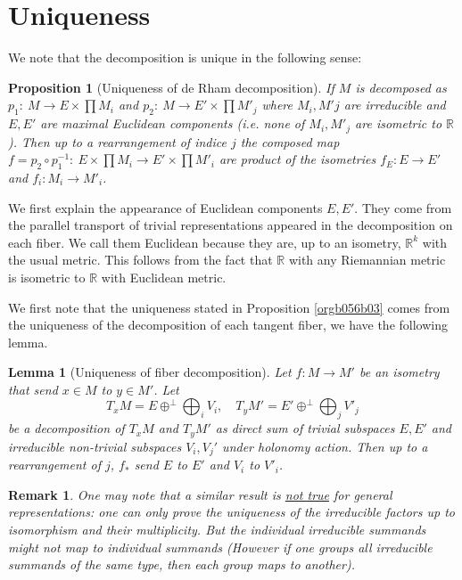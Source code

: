 \documentclass[11pt]{article}
\newtheorem{remark}{Remark}
\newtheorem{lemma}[theorem]{Lemma}
\newtheorem{proposition}{Proposition}[theorem]
\begin{document}
\section{Uniqueness}
\label{sec:org7171d65}
We note that the decomposition is unique in the following sense: 

\begin{proposition}[Uniqueness of de Rham decomposition]
\label{prop:uniqueness}
\label{orgb056b03} If \(M\) is decomposed as \(p_1:\ M\longrightarrow E\times \prod M_i\) and \(p_2:\
M\longrightarrow E'\times\prod M'_j\) where \(M_i, M'j\) are irreducible and \(E,E'\) are maximal
Euclidean components (i.e. none of \(M_i, M'_j\) are isometric to \(\mathbb{R}\)). Then up to a
rearrangement of indice \(j\) the composed map \(f=p_2\circ p_1^{-1}:\ E\times\prod M_i \longrightarrow
E'\times \prod M'_i\) are product of the isometries \(f_E: E\longrightarrow E'\) and \(f_i:M_i
\longrightarrow M'_i\).
\end{proposition}

We first explain the appearance of Euclidean components \(E,E'\). They come from the parallel
transport of trivial representations appeared in the decomposition on each fiber. We call them
Euclidean because they are, up to an isometry, \(\mathbb{R}^k\) with the usual metric. This follows
from the fact that \(\mathbb{R}\) with any Riemannian metric is isometric to \(\mathbb{R}\) with
Euclidean metric.

We first note that the uniqueness stated in Proposition \ref{orgb056b03} comes from the uniqueness of
the decomposition of each tangent fiber, we have the following lemma.

\begin{lemma}[Uniqueness of fiber decomposition]
\label{lem:uniqueness-fiber}
\label{orgb7febfa}
Let \(f: M\longrightarrow M'\) be an isometry that send \(x\in M\) to \(y\in M'\). Let 
\[
T_x M = E \oplus^\perp \bigoplus_i V_i,\quad T_yM' = E' \oplus^\perp \bigoplus_j V'_j
\]
be a decomposition of \(T_xM\) and \(T_yM'\) as direct sum of trivial subspaces \(E,E'\) and irreducible non-trivial
subspaces \(V_i, V_j'\) under holonomy action. Then up to a rearrangement of \(j\), \(f_*\) send \(E\) to
\(E'\) and \(V_i\) to \(V'_i\). 
\end{lemma}

\begin{remark}
One may note that a similar result is \uline{not true} for general representations: one can only prove the
uniqueness of the irreducible factors up to isomorphism and their multiplicity. But the individual irreducible
summands might not map to individual summands (However if one groups all irreducible summands of
the same type, then each group maps to another).
\end{remark}
\end{document}
